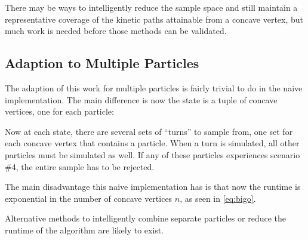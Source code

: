 There may be ways to intelligently reduce the sample space and still maintain a representative coverage of the kinetic paths attainable from a concave vertex, but much work is needed before those methods can be validated.

	\subsection{Adaption to Multiple Particles}

The adaption of this work for multiple particles is fairly trivial to do in the naive implementation. The main difference is now the state is a tuple of concave vertices, one for each particle:

 {
	\label{eq:multipleParticleStateSpace}
}

Now at each state, there are several sets of ``turns'' to sample from, one set for each concave vertex that contains a particle. When a turn is simulated, all other particles must be simulated as well. If any of these particles experiences scenario \#4, the entire sample has to be rejected.

The main disadvantage this naive implementation has is that now the runtime is exponential in the number of concave vertices $n$, as seen in \eqref{eq:bigo}.

 {
	\label{eq:bigoTotal}
}

Alternative methods to intelligently combine separate particles or reduce the runtime of the algorithm are likely to exist.

